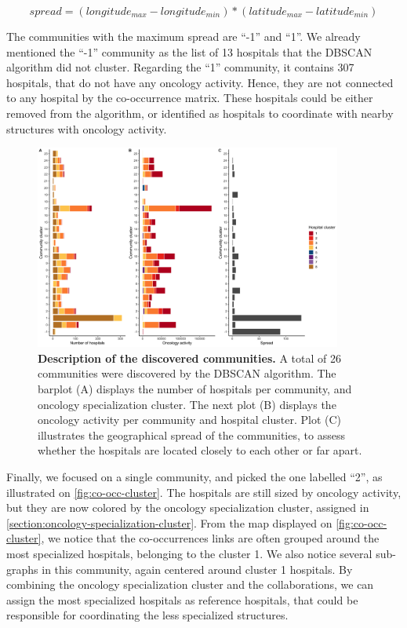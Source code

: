 \begin{equation}
    spread = (longitude_{max} - longitude_{min}) * (latitude_{max} - latitude_{min})
    \label{eq:spread}
\end{equation}

The communities with the maximum spread are ``-1'' and ``1''. We already
mentioned the ``-1'' community as the list of 13 hospitals that the DBSCAN
algorithm did not cluster. Regarding the ``1'' community, it contains 307
hospitals, that do not have any oncology activity. Hence, they are not connected
to any hospital by the co-occurrence matrix. These hospitals could be either
removed from the algorithm, or identified as hospitals to coordinate with nearby
structures with oncology activity.

\begin{figure}[h!]
    \includegraphics[width=0.9\textwidth]{images/co-occurrences/fig3.png}
    \centering
    \caption{ \textbf{Description of the discovered communities.} A total of 26
        communities were discovered by the DBSCAN algorithm. The barplot (A)
        displays the number of hospitals per community, and oncology specialization
        cluster. The next plot (B) displays the oncology activity per community and
        hospital cluster. Plot (C) illustrates the geographical spread of the
        communities, to assess whether the hospitals are located closely to each
        other or far apart. }
    \label{fig:co-occ-description}
\end{figure}

Finally, we focused on a single community, and picked the one labelled ``2'', as
illustrated on \cref{fig:co-occ-cluster}. The hospitals are still sized by
oncology activity, but they are now colored by the oncology specialization
cluster, assigned in \cref{section:oncology-specialization-cluster}. From the
map displayed on \cref{fig:co-occ-cluster}, we notice that the co-occurrences
links are often grouped around the most specialized hospitals, belonging to the
cluster 1. We also notice several sub-graphs in this community, again centered
around cluster 1 hospitals. By combining the oncology specialization cluster and
the collaborations, we can assign the most specialized hospitals as reference
hospitals, that could be responsible for coordinating the less specialized
structures.

